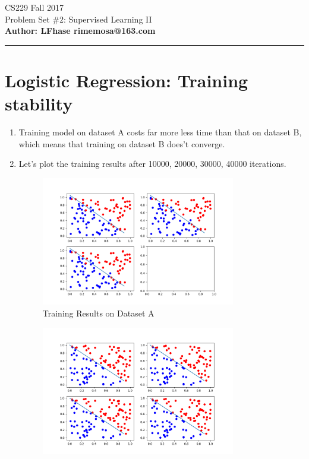 \documentclass[12pt]{article}
\begin{document}
    \begin{flushleft}
    \LARGE CS229 Fall 2017\\
    \LARGE Problem Set \#2:  Supervised Learning II    \\
    \textbf{\normalsize Author: LFhase \quad rimemosa@163.com}
    \end{flushleft} 
    \noindent
    \rule{\linewidth}{0.4pt}


    \section*{Logistic Regression: Training stability  }

    \begin{enumerate}[label=(\alph*)]
    \item Training model on dataset A costs far more less time than that on dataset B, which means that training on dataset B does't converge.
    \item 
    Let's plot the training results after 10000, 20000, 30000, 40000 iterations.
    \begin{figure}[H]
        \centering
        \includegraphics[width=0.80\textwidth]{Q1/training_dsA.png}
        \caption{Training Results on Dataset A}
    \end{figure}
    \begin{figure}[H]
        \centering
        \includegraphics[width=0.80\textwidth]{Q1/training_dsB.png}

\end{figure}
\end{enumerate}
\end{document}
